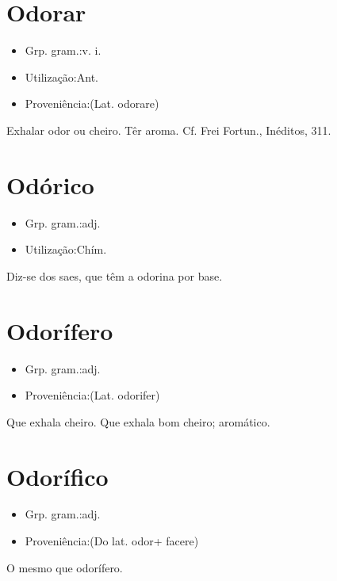 \section{Odorar}
\begin{itemize}
\item {Grp. gram.:v. i.}
\end{itemize}
\begin{itemize}
\item {Utilização:Ant.}
\end{itemize}
\begin{itemize}
\item {Proveniência:(Lat. \textunderscore odorare\textunderscore )}
\end{itemize}
Exhalar odor ou cheiro.
Têr aroma. Cf. Frei Fortun., \textunderscore Inéditos\textunderscore , 311.
\section{Odórico}
\begin{itemize}
\item {Grp. gram.:adj.}
\end{itemize}
\begin{itemize}
\item {Utilização:Chím.}
\end{itemize}
Diz-se dos saes, que têm a odorina por base.
\section{Odorífero}
\begin{itemize}
\item {Grp. gram.:adj.}
\end{itemize}
\begin{itemize}
\item {Proveniência:(Lat. \textunderscore odorifer\textunderscore )}
\end{itemize}
Que exhala cheiro.
Que exhala bom cheiro; aromático.
\section{Odorífico}
\begin{itemize}
\item {Grp. gram.:adj.}
\end{itemize}
\begin{itemize}
\item {Proveniência:(Do lat. \textunderscore odor\textunderscore  + \textunderscore facere\textunderscore )}
\end{itemize}
O mesmo que \textunderscore odorífero\textunderscore .
